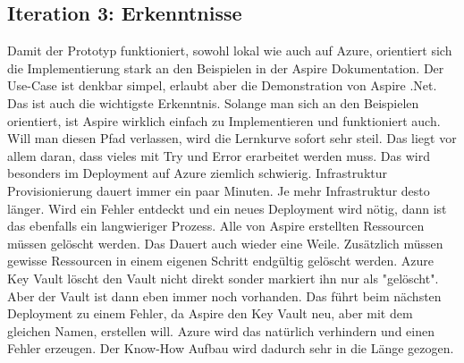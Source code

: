     \subsection{Iteration 3: Erkenntnisse}
        Damit der Prototyp funktioniert, sowohl lokal wie auch auf Azure, orientiert sich die Implementierung stark an den Beispielen in der Aspire Dokumentation. Der Use-Case ist denkbar simpel, erlaubt aber die Demonstration von Aspire .Net. Das ist auch die wichtigste Erkenntnis. Solange man sich an den Beispielen orientiert, ist Aspire wirklich einfach zu Implementieren und funktioniert auch. Will man diesen Pfad verlassen, wird die Lernkurve sofort sehr steil. Das liegt vor allem daran, dass vieles mit Try und Error erarbeitet werden muss. Das wird besonders im Deployment auf Azure ziemlich schwierig. Infrastruktur Provisionierung dauert immer ein paar Minuten. Je mehr Infrastruktur desto länger. Wird ein Fehler entdeckt und ein neues Deployment wird nötig, dann ist das ebenfalls ein langwieriger Prozess. Alle von Aspire erstellten Ressourcen müssen gelöscht werden. Das Dauert auch wieder eine Weile. Zusätzlich müssen gewisse Ressourcen in einem eigenen Schritt endgültig gelöscht werden. Azure Key Vault löscht den Vault nicht direkt sonder markiert ihn nur als "gelöscht". Aber der Vault ist dann eben immer noch vorhanden. Das führt beim nächsten Deployment zu einem Fehler, da Aspire den Key Vault neu, aber mit dem gleichen Namen, erstellen will. Azure wird das natürlich verhindern und einen Fehler erzeugen. Der Know-How Aufbau wird dadurch sehr in die Länge gezogen.
